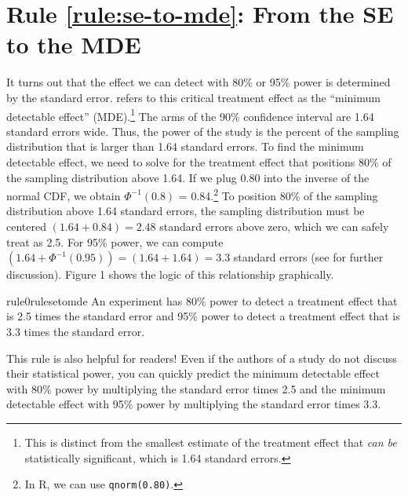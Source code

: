 \documentclass[12pt]{article}
\begin{document}
\section*{Rule \ref{rule:se-to-mde}: From the SE to the MDE}

It turns out that the effect we can detect with 80\% or 95\% power is determined by the standard error. 
\cite{Bloom1995} refers to this critical treatment effect as the ``minimum detectable effect'' (MDE).\footnote{
  This is distinct from the smallest estimate of the treatment effect that \textit{can be} statistically significant, which is 1.64 standard errors.
}
The arms of the 90\% confidence interval are 1.64 standard errors wide. 
Thus, the power of the study is the percent of the sampling distribution that is larger than 1.64 standard errors. 
To find the minimum detectable effect, we need to solve for the treatment effect that positions 80\% of the sampling distribution above 1.64. 
If we plug 0.80 into the inverse of the normal CDF, we obtain $\Phi^{- 1}(0.8)$ = 0.84.\footnote{
  In R, we can use \texttt{qnorm(0.80)}.
  } 
To position 80\% of the sampling distribution above 1.64 standard errors, the sampling distribution must be centered $(1.64 + 0.84) = 2.48$ standard errors above zero, which we can safely treat as 2.5. For 95\% power, we can compute $(1.64 + \Phi^{- 1}(0.95)) = (1.64 + 1.64) = 3.3$ standard errors (see \citealt{Bloom1995} for further discussion). 
Figure 1 shows the logic of this relationship graphically.

\begin{restatable}[SE to MDE]{rule0}{rulesetomde}
\label{rule:se-to-mde}
An experiment has 80\% power to detect a treatment effect that is 2.5 times the standard error and 95\% power to detect a treatment effect that is 3.3 times the standard error.
\end{restatable}

This rule is also helpful for readers! 
Even if the authors of a study do not discuss their statistical power, you can quickly predict the minimum detectable effect with 80\% power by multiplying the standard error times 2.5 and the minimum detectable effect with 95\% power by multiplying the standard error times 3.3.
\end{document}
